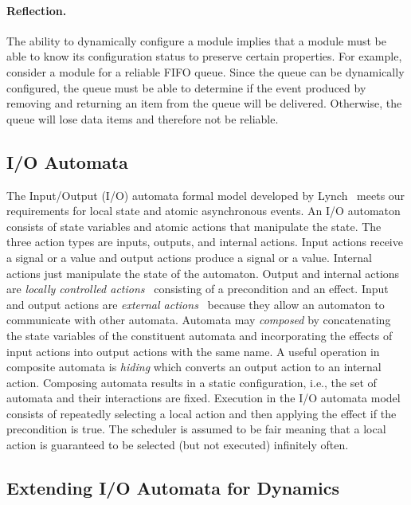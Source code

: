 \paragraph{Reflection.}
The ability to dynamically configure a module implies that a module must be able to know its configuration status to preserve certain properties.
For example, consider a module for a reliable FIFO queue.
Since the queue can be dynamically configured, the queue must be able to determine if the event produced by removing and returning an item from the queue will be delivered.
Otherwise, the queue will lose data items and therefore not be reliable.

\subsection{I/O Automata}

The Input/Output (I/O) automata formal model developed by Lynch~\cite{distributed_algorithms} meets our requirements for local state and atomic asynchronous events.
An I/O automaton consists of state variables and atomic actions that manipulate the state.
The three action types are inputs, outputs, and internal actions.
Input actions receive a signal or a value and output actions produce a signal or a value.
Internal actions just manipulate the state of the automaton.
Output and internal actions are \emph{locally controlled actions}~\cite{distributed_algorithms} consisting of a precondition and an effect.
Input and output actions are \emph{external actions}~\cite{distributed_algorithms} because they allow an automaton to communicate with other automata.
Automata may \emph{composed} by concatenating the state variables of the constituent automata and incorporating the effects of input actions into output actions with the same name.
A useful operation in composite automata is \emph{hiding} which converts an output action to an internal action.
Composing automata results in a static configuration, i.e., the set of automata and their interactions are fixed.
Execution in the I/O automata model consists of repeatedly selecting a local action and then applying the effect if the precondition is true.
The scheduler is assumed to be fair meaning that a local action is guaranteed to be selected (but not executed) infinitely often.

\subsection{Extending I/O Automata for Dynamics}

